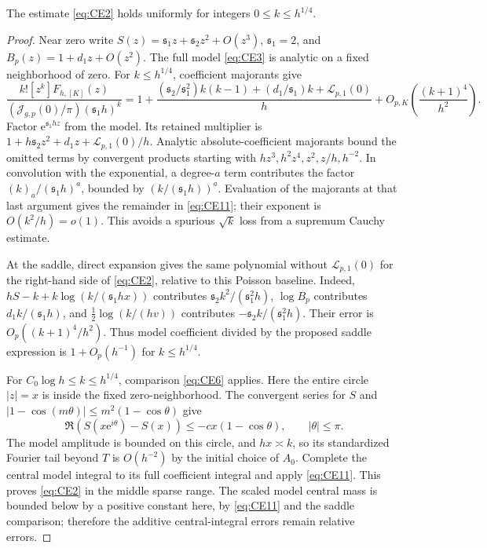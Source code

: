 \begin{lemma}\label{lem:small-indices}
The estimate \eqref{eq:CE2} holds uniformly for integers $0\le k\le h^{1/4}$.
\end{lemma}

\begin{proof}
Near zero write $S(z)=\mathfrak s_1z+\mathfrak s_2z^2+O(z^3)$, $\mathfrak s_1=2$, and
$B_p(z)=1+d_1z+O(z^2)$. The full model \eqref{eq:CE3} is analytic
on a fixed neighborhood of zero. For $k\le h^{1/4}$, coefficient
majorants give
\begin{equation}
 \frac{k![z^k]F_{h,[K]}(z)}
      {(\mathcal J_{g,p}(0)/\pi)(\mathfrak s_1h)^k}
 =1+\frac{(\mathfrak s_2/\mathfrak s_1^2)k(k-1)+(d_1/\mathfrak s_1)k+\mathcal L_{p,1}(0)}h
       +O_{p,K}\!\left(\frac{(k+1)^4}{h^2}\right).
 \label{eq:CE11}
\end{equation}
Factor $\mathrm{e}^{\mathfrak s_1hz}$ from the model. Its retained multiplier is
$1+h\mathfrak s_2z^2+d_1z+\mathcal L_{p,1}(0)/h$.
Analytic absolute-coefficient majorants bound the omitted terms by
convergent products starting with
$hz^3,h^2z^4,z^2,z/h,h^{-2}$. In convolution with the exponential,
a degree-$a$ term contributes the factor $(k)_a/(\mathfrak s_1h)^a$, bounded
by $(k/(\mathfrak s_1h))^a$. Evaluation of the majorants at that last argument
gives the remainder in \eqref{eq:CE11}; their exponent is
$O(k^2/h)=o(1)$. This avoids a spurious $\sqrt k$ loss from a
supremum Cauchy estimate.

At the saddle, direct expansion gives the same polynomial without
$\mathcal L_{p,1}(0)$ for the right-hand side of \eqref{eq:CE2},
relative to this Poisson baseline. Indeed,
$hS-k+k\log(k/(\mathfrak s_1hx))$ contributes $\mathfrak s_2k^2/(\mathfrak s_1^2h)$,
$\log B_p$ contributes $d_1k/(\mathfrak s_1h)$, and
$\tfrac12\log(k/(hv))$ contributes $-\mathfrak s_2k/(\mathfrak s_1^2h)$.
Their error is $O_p((k+1)^4/h^2)$. Thus model coefficient divided
by the proposed saddle expression is $1+O_p(h^{-1})$ for
$k\le h^{1/4}$.

For $C_0\log h\le k\le h^{1/4}$, comparison
\eqref{eq:CE6} applies. Here the entire circle $|z|=x$ is inside
the fixed zero-neighborhood. The convergent series for $S$ and
$|1-\cos(m\theta)|\le m^2(1-\cos\theta)$ give
\[
 \Re(S(x\mathrm{e}^{i\theta})-S(x))\le-cx(1-\cos\theta),
 \qquad |\theta|\le\pi.
\]
The model amplitude is bounded on this circle, and $hx\asymp k$,
so its standardized Fourier tail beyond $T$ is $O(h^{-2})$ by the
initial choice of $A_0$. Complete the central model integral to its full
coefficient integral and apply \eqref{eq:CE11}. This proves
\eqref{eq:CE2} in the middle sparse range. The scaled model central mass is bounded below by a
positive constant here, by \eqref{eq:CE11} and the saddle comparison;
therefore the additive central-integral errors remain relative errors.


\end{proof}
